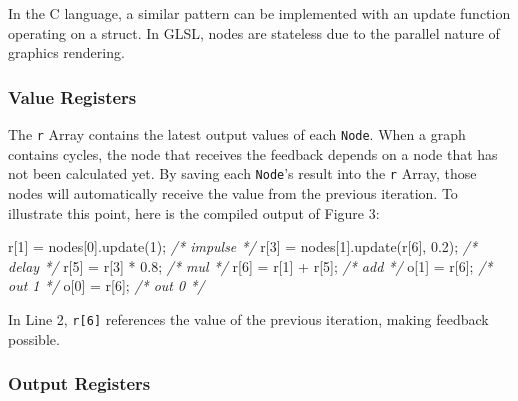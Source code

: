 \documentclass[11pt,]{article}
\newenvironment{Shaded}{}{}
\newcommand{\CommentTok}[1]{\textcolor[rgb]{0.38,0.63,0.69}{\textit{#1}}}
\newcommand{\DecValTok}[1]{\textcolor[rgb]{0.25,0.63,0.44}{#1}}
\newcommand{\FloatTok}[1]{\textcolor[rgb]{0.25,0.63,0.44}{#1}}
\newcommand{\FunctionTok}[1]{\textcolor[rgb]{0.02,0.16,0.49}{#1}}
\newcommand{\NormalTok}[1]{#1}
\newcommand{\OperatorTok}[1]{\textcolor[rgb]{0.40,0.40,0.40}{#1}}
\begin{document}
In the C language, a similar pattern can be implemented with an update
function operating on a struct. In GLSL, nodes are stateless due to the
parallel nature of graphics rendering.

\subsubsection{Value Registers}\label{value-registers}

The \texttt{r} Array contains the latest output values of each
\texttt{Node}. When a graph contains cycles, the node that receives the
feedback depends on a node that has not been calculated yet. By saving
each \texttt{Node}'s result into the \texttt{r} Array, those nodes will
automatically receive the value from the previous iteration. To
illustrate this point, here is the compiled output of Figure 3:

\begin{Shaded}
\begin{Highlighting}[]
\NormalTok{r[}\DecValTok{1}\NormalTok{] }\OperatorTok{=}\NormalTok{ nodes[}\DecValTok{0}\NormalTok{]}\OperatorTok{.}\FunctionTok{update}\NormalTok{(}\DecValTok{1}\NormalTok{)}\OperatorTok{;} \CommentTok{/* impulse */}
\NormalTok{r[}\DecValTok{3}\NormalTok{] }\OperatorTok{=}\NormalTok{ nodes[}\DecValTok{1}\NormalTok{]}\OperatorTok{.}\FunctionTok{update}\NormalTok{(r[}\DecValTok{6}\NormalTok{]}\OperatorTok{,} \FloatTok{0.2}\NormalTok{)}\OperatorTok{;} \CommentTok{/* delay */}
\NormalTok{r[}\DecValTok{5}\NormalTok{] }\OperatorTok{=}\NormalTok{ r[}\DecValTok{3}\NormalTok{] }\OperatorTok{*} \FloatTok{0.8}\OperatorTok{;} \CommentTok{/* mul */}
\NormalTok{r[}\DecValTok{6}\NormalTok{] }\OperatorTok{=}\NormalTok{ r[}\DecValTok{1}\NormalTok{] }\OperatorTok{+}\NormalTok{ r[}\DecValTok{5}\NormalTok{]}\OperatorTok{;} \CommentTok{/* add */}
\NormalTok{o[}\DecValTok{1}\NormalTok{] }\OperatorTok{=}\NormalTok{ r[}\DecValTok{6}\NormalTok{]}\OperatorTok{;} \CommentTok{/* out 1 */}
\NormalTok{o[}\DecValTok{0}\NormalTok{] }\OperatorTok{=}\NormalTok{ r[}\DecValTok{6}\NormalTok{]}\OperatorTok{;} \CommentTok{/* out 0 */}
\end{Highlighting}
\end{Shaded}

In Line 2, \texttt{r{[}6{]}} references the value of the previous
iteration, making feedback possible.

\subsubsection{Output Registers}\label{output-registers}
\end{document}
